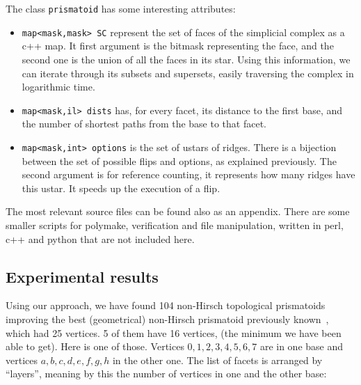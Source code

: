 \documentclass[12pt,a4paper]{article}
\theoremstyle{plain}
\theoremstyle{definition}
\begin{document}
The class \lstinline{prismatoid} has some interesting attributes:

\begin{itemize}
  \item \lstinline{map<mask,mask> SC} represent the set of faces of the simplicial complex as a c++ map. It first argument is the bitmask representing the face, and the second one is the union of all the faces in its star. Using this information, we can iterate through its subsets and supersets, easily traversing the complex in logarithmic time.
  \item \lstinline{map<mask,il> dists} has, for every facet, its distance to the first base, and the number of shortest paths from the base to that facet.

  \item \lstinline{map<mask,int> options} is the set of ustars of ridges. There is a bijection between the set of possible flips and options, as explained previously. The second argument is for reference counting, it represents how many ridges have this ustar. It speeds up the execution of a flip.
\end{itemize}

The most relevant source files can be found also as an appendix. There are some smaller scripts for polymake, verification and file manipulation, written in perl, c++ and python that are not included here.

\subsection{Experimental results}
Using our approach, we have found 104 non-Hirsch topological prismatoids improving
the best (geometrical) non-Hirsch prismatoid previously known~\cite{improvement}, which had 25 vertices. 5 of them have 16 vertices, (the minimum we have been able to get). Here is one of those. Vertices $0,1,2,3,4,5,6,7$ are in one base and vertices $a,b,c,d,e,f,g,h$ in the other one. The list of facets is arranged by ``layers'', meaning by this the number of vertices in one and the other base:
\end{document}
